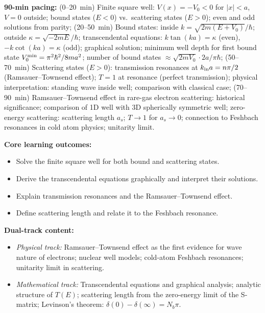 \documentclass[11pt,a4paper]{article}
\begin{document}
\begin{tcolorbox}[modulebox, title={Module~I.4 / L11: Scattering from a Potential Well}]
\textbf{90-min pacing:} (0--20~min) Finite square well: $V(x)=-V_0<0$ for $|x|<a$, $V=0$ outside;
bound states ($E<0$) vs.\ scattering states ($E>0$); even and odd solutions from parity;
(20--50~min) Bound states: inside $k=\sqrt{2m(E+V_0)}/\hbar$;
outside $\kappa=\sqrt{-2mE}/\hbar$;
transcendental equations: $k\tan(ka)=\kappa$ (even), $-k\cot(ka)=\kappa$ (odd);
graphical solution; minimum well depth for first bound state $V_0^{\rm min}=\pi^2\hbar^2/8ma^2$;
number of bound states $\approx\sqrt{2mV_0}\cdot 2a/\pi\hbar$;
(50--70~min) Scattering states ($E>0$): transmission resonances at $k_{\rm in}a=n\pi/2$
(Ramsauer--Townsend effect); $T=1$ at resonance (perfect transmission);
physical interpretation: standing wave inside well; comparison with classical case;
(70--90~min) Ramsauer--Townsend effect in rare-gas electron scattering: historical significance;
comparison of 1D well with 3D spherically symmetric well;
zero-energy scattering: scattering length $a_s$; $T\to1$ for $a_s\to0$;
connection to Feshbach resonances in cold atom physics; unitarity limit.

\medskip\textbf{Core learning outcomes:}
\begin{itemize}[leftmargin=1.4em,topsep=2pt,itemsep=1pt]
  \item Solve the finite square well for both bound and scattering states.
  \item Derive the transcendental equations graphically and interpret their solutions.
  \item Explain transmission resonances and the Ramsauer--Townsend effect.
  \item Define scattering length and relate it to the Feshbach resonance.
\end{itemize}

\medskip\textbf{Dual-track content:}
\begin{itemize}[leftmargin=1.4em,topsep=2pt,itemsep=1pt]
  \item \textit{Physical track:} Ramsauer--Townsend effect as the first evidence for wave nature of electrons;
    nuclear well models; cold-atom Feshbach resonances; unitarity limit in scattering.
  \item \textit{Mathematical track:} Transcendental equations and graphical analysis;
    analytic structure of $T(E)$; scattering length from the zero-energy limit of the S-matrix;
    Levinson's theorem: $\delta(0)-\delta(\infty)=N_b\pi$.
\end{itemize}


\end{tcolorbox}
\end{document}
